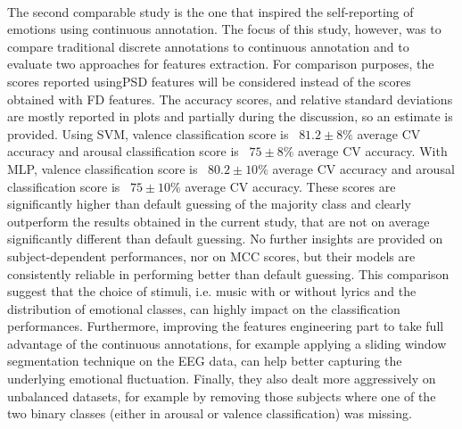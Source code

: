 \\
The second comparable study \cite{thammasan_continuous_2016} is the one that inspired the self-reporting of emotions using continuous annotation. The focus of this study, however, was to compare traditional discrete annotations to continuous annotation and to evaluate two approaches for features extraction. For comparison purposes, the scores reported using\ac{PSD} features will be considered instead of the scores obtained with \ac{FD} features. The accuracy scores, and relative standard deviations are mostly reported in plots and partially during the discussion, so an estimate is provided. Using \ac{SVM}, valence classification score is ~\(81.2\pm8\% \) average \ac{CV} accuracy and arousal classification score is ~\(75\pm8\%\) average CV accuracy. With MLP, valence classification score is ~\(80.2\pm10\%\) average \ac{CV} accuracy and arousal classification score is ~\(75\pm10\% \) average \ac{CV} accuracy. These scores are significantly higher than default guessing of the majority class and clearly outperform the results obtained in the current study, that are not on average significantly different than default guessing. No further insights are provided on subject-dependent performances, nor on \ac{MCC} scores, but their models are consistently reliable in performing better than default guessing. This comparison suggest that the choice of stimuli, i.e. music with or without lyrics and the distribution of emotional classes, can highly impact on the classification performances. Furthermore, improving the features engineering part to take full advantage of the continuous annotations, for example applying a sliding window segmentation technique on the \ac{EEG} data, can help better capturing the underlying emotional fluctuation. Finally, they also dealt more aggressively on unbalanced datasets, for example by removing those subjects where one of the two binary classes (either in arousal or valence classification) was missing.
\\ \

